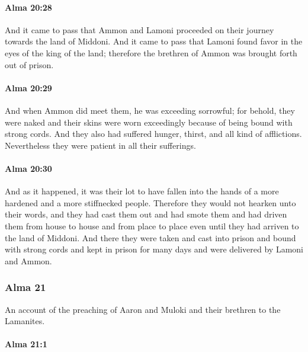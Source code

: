 		\paragraph{Alma 20:28} %
			\label{ALMA-20-28}

			And it came to pass that
			Ammon and Lamoni proceeded on their journey towards the land of Middoni.
			And it came to pass that Lamoni found favor in the eyes of the king of the land;
			therefore the brethren of Ammon was brought forth out of prison.

		\paragraph{Alma 20:29} %
			\label{ALMA-20-29}

			And when Ammon did meet them, he was exceeding sorrowful;
			for behold, they were naked and their skins were worn exceedingly
			because of being bound with strong cords.
			And they also had suffered hunger, thirst, and all kind of afflictions.
			Nevertheless they were patient in all their sufferings.

		\paragraph{Alma 20:30} %
			\label{ALMA-20-30}

			And as it happened, it was their lot
			to have fallen into the hands of a more hardened and a more stiffnecked people.
			Therefore they would not hearken unto their words,
			and they had cast them out and had smote them
			and had driven them from house to house and from place to place
			even until they had arriven to the land of Middoni.
			And there they were taken and cast into prison
			and bound with strong cords and kept in prison for many days
			and were delivered by Lamoni and Ammon.

	\subsubsection{Alma 21} %
		\label{ALMA-21}

		An account of the preaching of Aaron and Muloki and their brethren
		to the Lamanites.
		
		\paragraph{Alma 21:1} %
			\label{ALMA-21-1}

